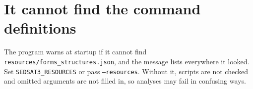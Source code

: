 \documentclass[11pt,a4paper]{report}
\begin{document}
\section{It cannot find the command definitions}

The program warns at startup if it cannot find
\texttt{resources/forms\_structures.json}, and the message lists everywhere it
looked. Set \texttt{SEDSAT3\_RESOURCES} or pass \texttt{--resources}. Without
it, scripts are not checked and omitted arguments are not filled in, so
analyses may fail in confusing ways.

\printindex
\end{document}
